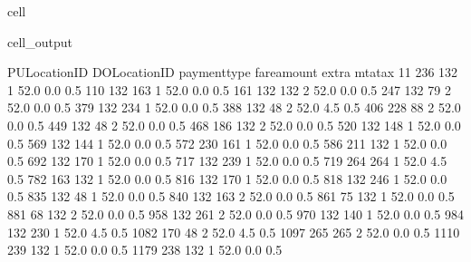 \documentclass[letterpaper,10pt,english]{sphinxmanual}
\begin{document}
\begin{sphinxuseclass}{cell}
\begin{sphinxuseclass}{cell_output}
\begin{sphinxVerbatim}[commandchars=\\\{\}]
      PULocationID  DOLocationID  payment\PYGZus{}type  fare\PYGZus{}amount  extra  mta\PYGZus{}tax  \PYGZbs{}
11             236           132             1         52.0    0.0      0.5   
110            132           163             1         52.0    0.0      0.5   
161            132           132             2         52.0    0.0      0.5   
247            132            79             2         52.0    0.0      0.5   
379            132           234             1         52.0    0.0      0.5   
388            132            48             2         52.0    4.5      0.5   
406            228            88             2         52.0    0.0      0.5   
449            132            48             2         52.0    0.0      0.5   
468            186           132             2         52.0    0.0      0.5   
520            132           148             1         52.0    0.0      0.5   
569            132           144             1         52.0    0.0      0.5   
572            230           161             1         52.0    0.0      0.5   
586            211           132             1         52.0    0.0      0.5   
692            132           170             1         52.0    0.0      0.5   
717            132           239             1         52.0    0.0      0.5   
719            264           264             1         52.0    4.5      0.5   
782            163           132             1         52.0    0.0      0.5   
816            132           170             1         52.0    0.0      0.5   
818            132           246             1         52.0    0.0      0.5   
835            132            48             1         52.0    0.0      0.5   
840            132           163             2         52.0    0.0      0.5   
861             75           132             1         52.0    0.0      0.5   
881             68           132             2         52.0    0.0      0.5   
958            132           261             2         52.0    0.0      0.5   
970            132           140             1         52.0    0.0      0.5   
984            132           230             1         52.0    4.5      0.5   
1082           170            48             2         52.0    4.5      0.5   
1097           265           265             2         52.0    0.0      0.5   
1110           239           132             1         52.0    0.0      0.5   
1179           238           132             1         52.0    0.0      0.5   


\end{sphinxVerbatim}
\end{sphinxuseclass}
\end{sphinxuseclass}
\end{document}
